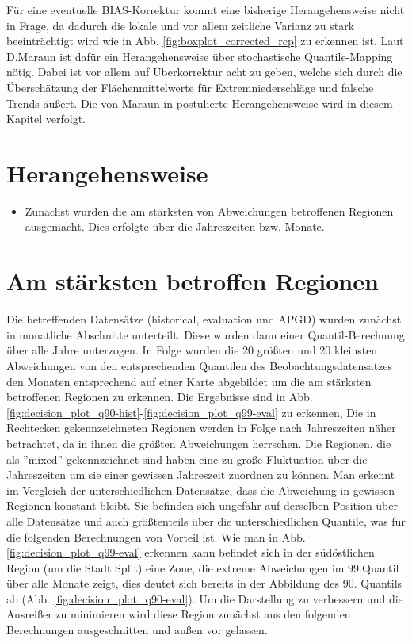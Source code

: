 Für eine eventuelle BIAS-Korrektur kommt eine bisherige Herangehensweise nicht in Frage, da dadurch die lokale und vor allem zeitliche Varianz zu stark beeinträchtigt wird wie in Abb. \ref{fig:boxplot_corrected_rcp} zu erkennen ist. Laut D.Maraun \cite{biasMaraun} ist dafür ein Herangehensweise über stochastische Quantile-Mapping nötig. Dabei ist vor allem auf Überkorrektur acht zu geben, welche sich durch die Überschätzung der Flächenmittelwerte für Extremniederschläge und falsche Trends äußert. Die von Maraun in \cite{biasMaraun} postulierte Herangehensweise wird in diesem Kapitel verfolgt.
\section{Herangehensweise}
\begin{itemize}
	\item Zunächst wurden die am stärksten von Abweichungen betroffenen Regionen ausgemacht. Dies erfolgte über die Jahreszeiten bzw. Monate.
\end{itemize}

\section{Am stärksten betroffen Regionen}
Die betreffenden Datensätze (historical, evaluation und APGD) wurden zunächst in monatliche Abschnitte unterteilt. Diese wurden dann einer Quantil-Berechnung über alle Jahre unterzogen. In Folge wurden die 20 größten und 20 kleinsten Abweichungen von den entsprechenden Quantilen des Beobachtungsdatensatzes den Monaten entsprechend auf einer Karte abgebildet um die am stärksten betroffenen Regionen zu erkennen. Die Ergebnisse sind in Abb. \ref{fig:decision_plot_q90-hist}-\ref{fig:decision_plot_q99-eval} zu erkennen, Die in Rechtecken gekennzeichneten Regionen werden in Folge nach Jahreszeiten näher betrachtet, da in ihnen die größten Abweichungen herrschen. Die Regionen, die als ''mixed'' gekennzeichnet sind haben eine zu große Fluktuation über die Jahreszeiten um sie einer gewissen Jahreszeit zuordnen zu können. Man erkennt im Vergleich der unterschiedlichen Datensätze, dass die Abweichung in gewissen Regionen konstant bleibt. Sie befinden sich ungefähr auf derselben Position über alle Datensätze und auch größtenteils über die unterschiedlichen Quantile, was für die folgenden Berechnungen von Vorteil ist. Wie man in Abb.\ref{fig:decision_plot_q99-eval} erkennen kann befindet sich in der südöstlichen Region (um die Stadt Split) eine Zone, die extreme Abweichungen im 99.Quantil über alle Monate zeigt, dies deutet sich bereits in der Abbildung des 90. Quantils ab (Abb. \ref{fig:decision_plot_q90-eval}). Um die Darstellung zu verbessern und die Ausreißer zu minimieren wird diese Region zunächst aus den folgenden Berechnungen ausgeschnitten und außen vor gelassen. 


